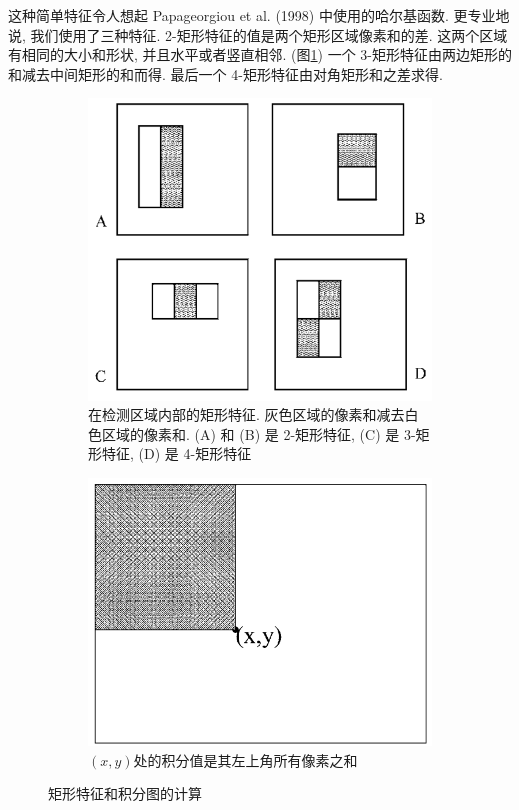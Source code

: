 \documentclass[a4paper,utf8,11pt, onecolumn]{ctexart}
\renewcommand{\captionlabelfont}{\kaishu\zihao{5}}
\begin{document}
这种简单特征令人想起 Papageorgiou et al. (1998) 中使用的哈尔基函数. 更专业地说, 我们使用了三种特征. 2-矩形特征的值是两个矩形区域像素和的差. 这两个区域有相同的大小和形状, 并且水平或者竖直相邻. (图\ref{fig:rectangle})
一个 3-矩形特征由两边矩形的和减去中间矩形的和而得. 最后一个 4-矩形特征由对角矩形和之差求得. 
\begin{figure}[!htb]
\centering
\begin{subfigure}{0.3\textwidth}
\includegraphics[width=\textwidth]{rectangle.png}
\renewcommand{\captionlabelfont}{\kaishu\zihao{6}}
\caption{ 在检测区域内部的矩形特征. 灰色区域的像素和减去白色区域的像素和. (A) 和 (B) 是 2-矩形特征, (C) 是 3-矩形特征, (D) 是 4-矩形特征}
\label{fig:rectangle}
\end{subfigure}
\quad\quad\quad\quad
\begin{subfigure}{0.3\textwidth}
\includegraphics[width=\textwidth]{int.png}
\renewcommand{\captionlabelfont}{\kaishu\zihao{6}}
\caption{$(x,y)$处的积分值是其左上角所有像素之和}
\label{fig:int}
\end{subfigure}
\caption{矩形特征和积分图的计算}
\end{figure}
\end{document}
